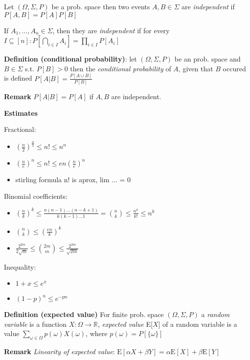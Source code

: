 \documentclass[a4paper]{article}
\begin{document}
Let $(\Omega, \Sigma, P)$ be a prob. space then two events $A, B \in \Sigma$ are \emph{independent} if $P[A,B] = P[A] P[B]$

If $A_1, \ldots, A_n \in \Sigma$, then they are \emph{independent} if for every $I \subseteq [n]: P[\bigcap_{i \in I} A_i] = \prod_{i \in I} P[A_i]$

\textbf{Definition (conditional probability)}: let $(\Omega, \Sigma, P)$ be an prob. space and $B \in \Sigma$ s.t. $P[B] > 0$ then the \emph{conditional probability} of $A$, given that $B$ occured is defined $P[A|B] = \frac{P[A \cup B]}{P[B]}$

\textbf{Remark}
$P[A|B] = P[A]$ if $A, B$ are independent.

\textbf{Estimates}

Fractional:
\begin{itemize}
	\item $\left(\frac{n}{2}\right)^{\frac{n}{2}} \leq n! \leq n^n$
	\item $\left(\frac{n}{e}\right)^n \leq n! \leq en\left(\frac{n}{e}\right)^n$
	\item stirling formula n! is aprox, lim ... = 0
\end{itemize}

Binomial coefficients:
\begin{itemize}
	\item $\left(\frac{n}{k}\right)^k \leq \frac{n(n-1)\ldots(n-k+1)}{k(k-1)\ldots1} = {n \choose k} \leq \frac{n^k}{k!} \leq n^k$
	\item ${n \choose k} \leq \left(\frac{en}{k}\right)^k$
	\item $\frac{2^{2m}}{2\sqrt{m}} \leq {{2m} \choose m} \leq \frac{2^{2m}}{\sqrt{2m}}$
\end{itemize}

Inequality:
\begin{itemize}
	\item $1+x \leq e^x$
	\item $(1-p)^n \leq e^{-pn}$
\end{itemize}

\textbf{Definition (expected value)} For finite prob. space $(\Omega, \Sigma, P)$ a \emph{random variable} is a function $X: \Omega \rightarrow \mathbb{R}$,
\emph{expected value} E[$X$] of a random variable is a value $\sum_{\omega \in \Omega} p(\omega) X(\omega)$, where $p(\omega) = P[\{\omega\}]$

\textbf{Remark} \emph{Linearity of expected value}: $\mathrm{E}[\alpha{}X + \beta{}Y] = \alpha\mathrm{E}[X] + \beta\mathrm{E}[Y]$
\end{document}
